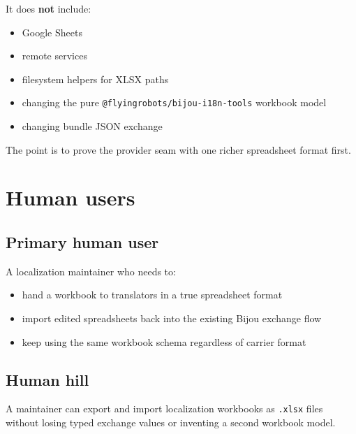 It does \textbf{not} include:

\begin{itemize}
\tightlist
\item
  Google Sheets
\item
  remote services
\item
  filesystem helpers for XLSX paths
\item
  changing the pure \texttt{@\allowbreak{}f\allowbreak{}l\allowbreak{}y\allowbreak{}i\allowbreak{}n\allowbreak{}g\allowbreak{}r\allowbreak{}o\allowbreak{}b\allowbreak{}o\allowbreak{}t\allowbreak{}s\allowbreak{}/\allowbreak{}b\allowbreak{}i\allowbreak{}j\allowbreak{}o\allowbreak{}u\allowbreak{}-\allowbreak{}i\allowbreak{}1\allowbreak{}8\allowbreak{}n\allowbreak{}-\allowbreak{}t\allowbreak{}o\allowbreak{}o\allowbreak{}l\allowbreak{}s} workbook model
\item
  changing bundle JSON exchange
\end{itemize}

The point is to prove the provider seam with one richer spreadsheet format first.

\section{Human users}\label{record-193-human-users}

\subsection{Primary human user}\label{record-193-primary-human-user}

A localization maintainer who needs to:

\begin{itemize}
\tightlist
\item
  hand a workbook to translators in a true spreadsheet format
\item
  import edited spreadsheets back into the existing Bijou exchange flow
\item
  keep using the same workbook schema regardless of carrier format
\end{itemize}

\subsection{Human hill}\label{record-193-human-hill}

A maintainer can export and import localization workbooks as \texttt{.\allowbreak{}x\allowbreak{}l\allowbreak{}s\allowbreak{}x} files without losing typed exchange values or inventing a second workbook model.

